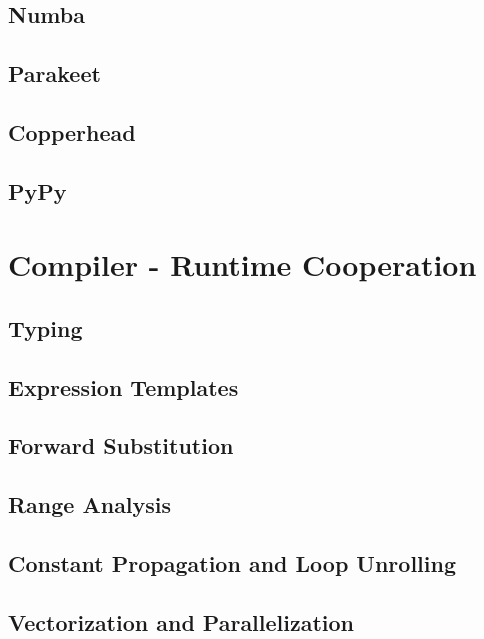 \documentclass[10pt, preprint]{sigplanconf}
\begin{document}
\subsection{Numba}
\cite{numba}

\subsection{Parakeet}
\cite{parakeet2012}

\subsection{Copperhead}
\cite{copperhead2011}

\subsection{PyPy}
\cite{pypy2009}

\section{Compiler - Runtime Cooperation}

\subsection{Typing}

\subsection{Expression Templates}

\cite{expression_templates, et2012}

\subsection{Forward Substitution}

\subsection{Range Analysis}

\subsection{Constant Propagation and Loop Unrolling}

\subsection{Vectorization and Parallelization}
\end{document}
